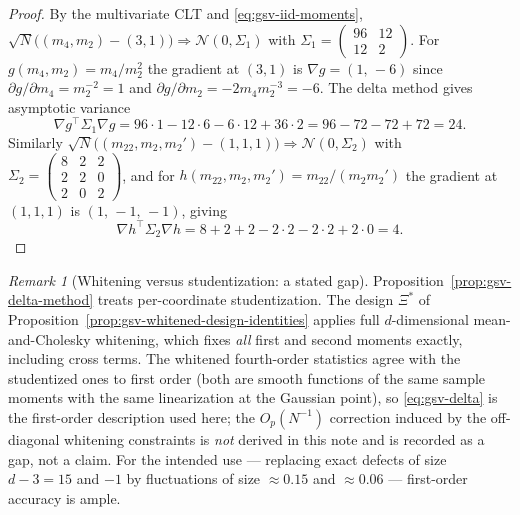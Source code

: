 \documentclass[11pt]{article}
\theoremstyle{definition}
\theoremstyle{remark}
\newtheorem{remark}[proposition]{Remark}
\begin{document}
\begin{proof}
By the multivariate CLT and \eqref{eq:gsv-iid-moments},
$\sqrt N\big((m_4,m_2)-(3,1)\big)\Rightarrow\mathcal N(0,\Sigma_1)$ with
$\Sigma_1=\begin{pmatrix}96&12\\12&2\end{pmatrix}$.
For $g(m_4,m_2)=m_4/m_2^{2}$ the gradient at $(3,1)$ is
$\nabla g=(1,\,-6)$ since $\partial g/\partial m_4=m_2^{-2}=1$ and
$\partial g/\partial m_2=-2m_4m_2^{-3}=-6$.  The delta method gives
asymptotic variance
\begin{equation}
\label{eq:gsv-delta-kurt-arithmetic}
 \nabla g^{\top}\Sigma_1\nabla g
 =96\cdot1-12\cdot6-6\cdot12+36\cdot2
 =96-72-72+72=24 .
\end{equation}
Similarly
$\sqrt N\big((m_{22},m_2,m_2')-(1,1,1)\big)\Rightarrow\mathcal N(0,\Sigma_2)$
with
$\Sigma_2=\begin{pmatrix}8&2&2\\2&2&0\\2&0&2\end{pmatrix}$,
and for $h(m_{22},m_2,m_2')=m_{22}/(m_2m_2')$ the gradient at $(1,1,1)$ is
$(1,\,-1,\,-1)$, giving
\begin{equation}
\label{eq:gsv-delta-cokurt-arithmetic}
 \nabla h^{\top}\Sigma_2\nabla h
 =8+2+2-2\cdot2-2\cdot2+2\cdot0=4 .
\end{equation}
\end{proof}

\begin{remark}[Whitening versus studentization: a stated gap]
\label{rem:gsv-whitening-gap}
Proposition~\ref{prop:gsv-delta-method} treats per-coordinate studentization.
The design $\Xi^{*}$ of
Proposition~\ref{prop:gsv-whitened-design-identities} applies full
$d$-dimensional mean-and-Cholesky whitening, which fixes \emph{all} first and
second moments exactly, including cross terms.  The whitened fourth-order
statistics agree with the studentized ones to first order (both are smooth
functions of the same sample moments with the same linearization at the
Gaussian point), so \eqref{eq:gsv-delta} is the first-order description used
here; the $O_p(N^{-1})$ correction induced by the off-diagonal
whitening constraints is \emph{not} derived in this note and is recorded as
a gap, not a claim.  For the intended use --- replacing exact defects of size
$d-3=15$ and $-1$ by fluctuations of size $\approx0.15$ and $\approx0.06$ ---
first-order accuracy is ample.
\end{remark}
\end{document}
